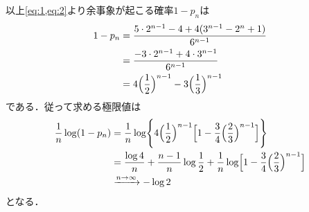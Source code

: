 \documentclass[../../main.tex]{subfiles}
\begin{document}
以上\cref{eq:1,eq:2}より余事象が起こる確率$1-p_n$は
\begin{align}
  \begin{split}
    1-p_n
    &=\dfrac{5\cdot 2^{n-1}-4+4(3^{n-1}-2^n+1)}{6^{n-1}}\\
    &=\dfrac{-3\cdot 2^{n-1}+4\cdot 3^{n-1}}{6^{n-1}}\\
    &=4\Bigl(\dfrac{1}{2}\Bigr)^{n-1}
    -3\Bigl(\dfrac{1}{3}\Bigr)^{n-1}
  \end{split}
\end{align}
である．従って求める極限値は
\begin{align}
  \dfrac{1}{n}\log(1-p_n)
  &=\dfrac{1}{n}\log\Biggl\{
    4\Bigl(\dfrac{1}{2}\Bigr)^{n-1}
  \Bigl[1-\dfrac{3}{4}\Bigl(\dfrac{2}{3}\Bigr)^{n-1}\Bigr]\Biggr\}\\
  &=\dfrac{\log 4}{n}+\dfrac{n-1}{n}\log\dfrac{1}{2}
  +\dfrac{1}{n}\log\Bigl[1-\dfrac{3}{4}\Bigl(\dfrac{2}{3}\Bigr)^{n-1}\Bigr] \\
  &\xrightarrow{n\to\infty} -\log 2
\end{align}
となる．

\newpage
\end{document}
